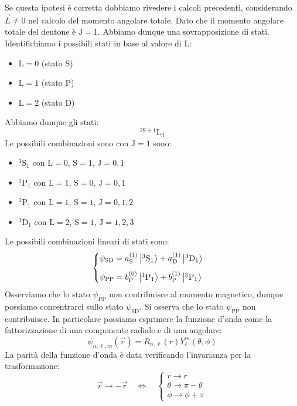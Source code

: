 Se questa ipotesi è corretta dobbiamo rivedere i calcoli precedenti, considerando $\vec{L} \neq 0$ nel calcolo del momento angolare totale. Dato che il momento angolare totale del deutone è $\text{J}=1$. Abbiamo dunque una sovrapposizione di stati. Identifichiamo i possibili stati in base al valore di $\text{L}$:
\begin{itemize}
 \item $\text{L}=0$ (stato S)
 \item $\text{L}=1$ (stato P)
 \item $\text{L}=2$ (stato D)
\end{itemize}
Abbiamo dunque gli stati:
\begin{equation}
 ^{2\text{S}+1}\text{L}_{\text{J}}
\end{equation}
Le possibili combinazioni sono con $\text{J} = 1$ sono:
\begin{itemize}
 \item $^3\text{S}_1$ con $\text{L}=0$, $\text{S}=1$, $\text{J}=0,1$
 \item $^1\text{P}_1$ con $\text{L}=1$, $\text{S}=0$, $\text{J}=0,1$
 \item $^3\text{P}_1$ con $\text{L}=1$, $\text{S}=1$, $\text{J}=0,1,2$
 \item $^3\text{D}_1$ con $\text{L}=2$, $\text{S}=1$,  $\text{J}=1,2,3$
\end{itemize}
Le possibili combinazioni lineari di stati sono:
\begin{equation}
 \begin{cases}
  \psi_{\text{SD}} = a_{\text{S}}^{(1)}\ket{^3\text{S}_1} + a_{\text{D}}^{(1)} \ket{^3\text{D}_1} \\[8pt]
  \psi_{\text{PP}} = b_{\text{P}}^{(0)} \ket{^1\text{P}_1} + b_{\text{P}}^{(1)} \ket{^3\text{P}_1}
 \end{cases}
\end{equation}
Osserviamo che lo stato $\psi_{\text{PP}}$ non contribuisce al momento magnetico, dunque possiamo concentrarci sullo stato $\psi_{\text{SD}}$.
Si osserva che lo stato $\psi_{\text{PP}}$ non contribuisce. In particolare possiamo esprimere la funzione d'onda come la fattorizzazione di una componente radiale e di una angolare:
\begin{equation}
  \psi_{n,\ell,m}(\vec{r}) = R_{n,\ell}(r) Y_{\ell}^{m}(\theta,\phi)
\end{equation}
La parità della funzione d'onda è data verificando l'invarianza per la trasformazione:
\begin{equation}
    \vec{r} \rightarrow -\vec{r} \quad \Longleftrightarrow \quad
    \begin{cases}
        r \rightarrow r \\
        \theta \rightarrow \pi - \theta \\
        \phi \rightarrow \phi + \pi
    \end{cases}
\end{equation}
